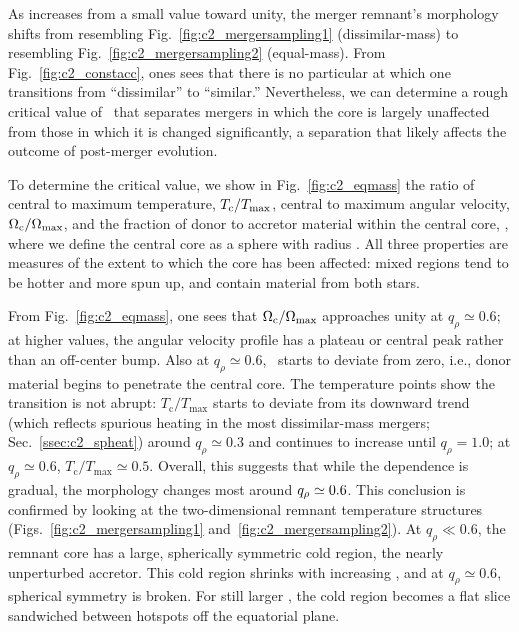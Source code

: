 
As {\qrho} increases from a small value toward unity, the merger remnant's morphology shifts from resembling Fig.~\ref{fig:c2_mergersampling1} (dissimilar-mass) to resembling Fig.~\ref{fig:c2_mergersampling2} (equal-mass).  From Fig.~\ref{fig:c2_constacc}, ones sees that there is no particular {\qrho} at which one transitions from ``dissimilar'' to ``similar.''  Nevertheless, we can determine a rough critical value of~{\qrho} that separates mergers in which the core is largely unaffected from those in which it is changed significantly, a separation that likely affects the outcome of post-merger evolution.

To determine the critical value, we show in Fig.~\ref{fig:c2_eqmass} the ratio of central to maximum temperature, $T_\mathrm{c}/T_{\rm max}$, central to maximum angular velocity, $\Omega_\mathrm{c}/\Omega_{\rm max}$, and the fraction of donor to accretor material within the central core, \fratio, where we define the central core as a sphere with radius \hz.  All three properties are measures of the extent to which the core has been affected: mixed regions tend to be hotter and more spun up, and contain material from both stars.

From Fig.~\ref{fig:c2_eqmass}, one sees that $\Omega_\mathrm{c}/\Omega_\mathrm{max}$ approaches unity at $q_\rho\simeq0.6$; at higher values, the angular velocity profile has a plateau or central peak rather than an off-center bump.  Also at $q_\rho\simeq0.6$, \fratio\ starts to deviate from zero, i.e., donor material begins to penetrate the central core.  The temperature points show the transition is not abrupt: $T_\mathrm{c}/T_\mathrm{max}$ starts to deviate from its downward trend (which reflects spurious heating in the most dissimilar-mass mergers; Sec.~\ref{ssec:c2_spheat}) around $q_\rho\simeq0.3$ and continues to increase until $q_\rho=1.0$; at $q_\rho\simeq0.6$, $T_\mathrm{c}/T_\mathrm{max}\simeq0.5$.  Overall, this suggests that while the dependence is gradual, the morphology changes most around $\qrho\simeq0.6$.  This conclusion is confirmed by looking at the two-dimensional remnant temperature structures (Figs.~\ref{fig:c2_mergersampling1} and~\ref{fig:c2_mergersampling2}).  At $q_\rho\ll0.6$, the remnant core has a large, spherically symmetric cold region, the nearly unperturbed accretor.  This cold region shrinks with increasing \qrho, and at $q_\rho\simeq0.6$, spherical symmetry is broken.  For still larger \qrho, the cold region becomes a flat slice sandwiched between hotspots off the equatorial plane.

